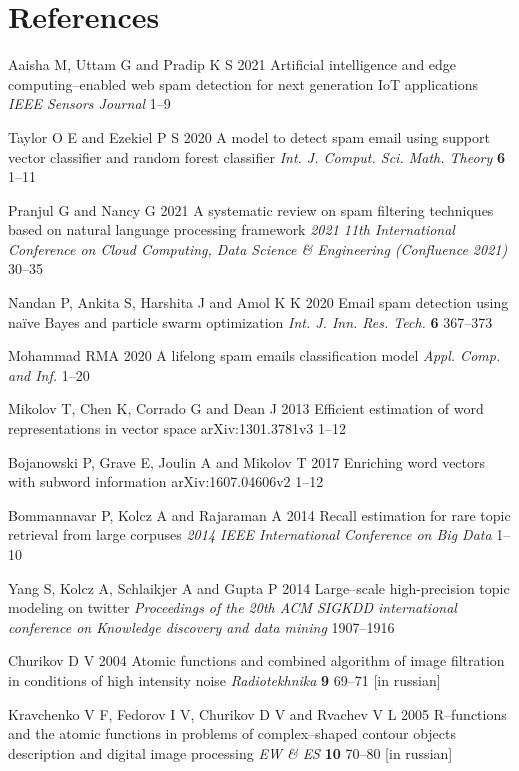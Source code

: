 \documentclass[a4paper]{jpconf}
\begin{document}
\section*{References}
\begin{thebibliography}{99}
\normalsize
{} 
Aaisha M, Uttam G and Pradip K S
2021 {Artificial intelligence and edge computing--enabled
web spam detection for next generation IoT
applications} {\it IEEE Sensors Journal} {\bf } 1--9

Taylor O E and Ezekiel P S
2020 {A model to detect spam email using support vector classifier and random forest classifier} 
\emph{Int. J. Comput. Sci. Math. Theory} {\bf 6} 1--11

Pranjul G and Nancy G
2021 {A systematic review on spam filtering techniques based on
natural language processing framework} \emph{2021 11th International Conference on Cloud Computing, Data Science \& Engineering (Confluence 2021)} 30--35

Nandan P, Ankita S, Harshita J and Amol K K
2020 {Email spam detection using naïve Bayes and particle swarm optimization} \emph{Int. J. Inn. Res. Tech.} {\bf 6} 367--373

Mohammad RMA
2020 {A lifelong spam emails classification model}
\emph{Appl. Comp. and Inf.} 1--20

Mikolov T, Chen K, Corrado G and Dean J
2013 {Efficient estimation of word representations in vector space} 
arXiv:1301.3781v3 1--12

Bojanowski P, Grave E, Joulin A and Mikolov T
2017 {Enriching word vectors with subword information} 
arXiv:1607.04606v2 1--12

Bommannavar P, Kolcz A and Rajaraman A
2014 {Recall estimation for rare topic retrieval from large corpuses}
\emph{2014 IEEE International Conference on Big Data} 1--10

Yang S, Kolcz A, Schlaikjer A and Gupta P
2014 {Large--scale high-precision topic modeling on twitter} 
\emph{Proceedings of the 20th ACM SIGKDD international conference on Knowledge discovery and data mining} 1907--1916

 Churikov D V 2004
{Atomic functions and combined algorithm of image filtration in conditions of high intensity noise}
\emph{Radiotekhnika} \textbf{9} 69--71 [in russian]

Kravchenko V F, Fedorov I V, Churikov D V and Rvachev V L 2005 
{R--functions and the atomic functions in problems of complex--shaped contour objects description and digital image processing}
\emph{EW \& ES} \textbf{10} 70--80 [in russian]
\end{thebibliography}
\end{document}
